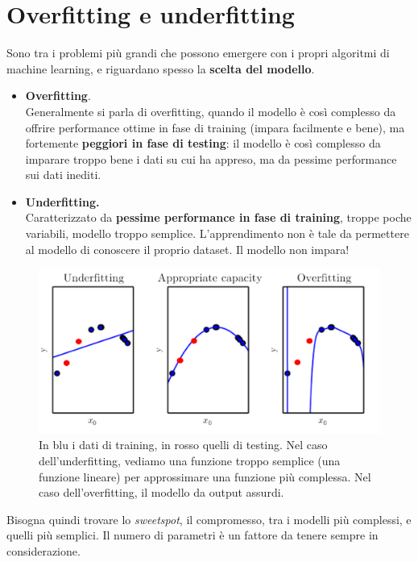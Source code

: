 \newpage

\section{Overfitting e underfitting}
Sono tra i problemi più grandi che possono emergere con i propri algoritmi di machine learning, e riguardano spesso la \textbf{scelta del modello}. 

\begin{itemize}
	\item \textbf{Overfitting}.\\
	Generalmente si parla di overfitting, quando il modello è così complesso da offrire performance ottime in fase di training (impara facilmente e bene), ma fortemente \textbf{peggiori in fase di testing}: il modello è così complesso da imparare troppo bene i dati su cui ha appreso, ma da pessime performance sui dati inediti. 
	\item \textbf{Underfitting.}\\
	Caratterizzato da \textbf{pessime performance in fase di training}, troppe poche variabili, modello troppo semplice. L'apprendimento non è tale da permettere al modello di conoscere il proprio dataset. Il modello non impara!
\end{itemize}

\begin{figure}[htbp]
	\centering
	\includegraphics[width=\textwidth]{images/underoverfitting}
	\caption{In blu i dati di training, in rosso quelli di testing. Nel caso dell'underfitting, vediamo una funzione troppo semplice (una funzione lineare) per approssimare una funzione più complessa. Nel caso dell'overfitting, il modello da output assurdi.}
	\label{fig:underoverfitting}
\end{figure}

Bisogna quindi trovare lo \textit{sweetspot}, il compromesso, tra i modelli più complessi, e quelli più semplici. Il numero di parametri è un fattore da tenere sempre in considerazione. 

